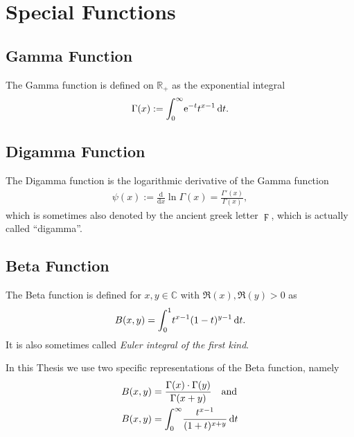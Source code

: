 \section{Special Functions}
\subsection{Gamma Function}
The Gamma function is defined on $\mathbb{R}_{+}$ as the exponential integral
\begin{align}
    \Gamma(x) := \Integ[\infty]{0}{t}{\Eto{-t}t^{x-1}}.
    \label{def:gamma}
\end{align}

\subsection{Digamma Function}
The Digamma function is the logarithmic derivative of the Gamma function
\begin{align}
    \psi(x) := \frac{\mathrm d}{\mathrm dx}\ln{\Gamma(x)}
            = \frac{\Gamma'(x)}{\Gamma(x)},
    \label{def:digamma}
\end{align}
which is sometimes also denoted by the ancient greek letter $\digamma$, which is
actually called ``digamma''.

\subsection{Beta Function}
\label{sec:beta_function}
The Beta function is defined for $x,y\in\mathbb{C}$ with $\Re(x),\Re(y) > 0$ as
\begin{align}
    B(x,y) = \Integ[1]{0}{t}{t^{x-1}(1-t)^{y-1}}.
    \label{def:beta}
\end{align}
It is also sometimes called \textit{Euler integral of the first kind}.

In this Thesis we use two specific representations of the Beta function, namely
\begin{align}
    B(x, y) &= \frac{\Gamma(x)\cdot\Gamma(y)}{\Gamma(x+y)} \quad \text{and}
    \label{frm:beta_rep1} \\
    B(x, y) &= \Integ[\infty]{0}{t}{\frac{t^{x-1}}{(1 + t)^{x+y}}}
    \label{frm:beta_rep2}
\end{align}

